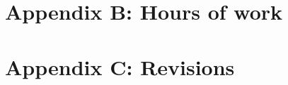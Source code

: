\documentclass[openright]{report}
\begin{document}
	\newpage
	\chapter{Appendix B: Hours of work}
	    

	\newpage
	\chapter{Appendix C: Revisions}
	    

	
	\glsaddall
	\printglossaries

	\newpage
	\begin{thebibliography}{10}
		
	\end{thebibliography}
\end{document}
